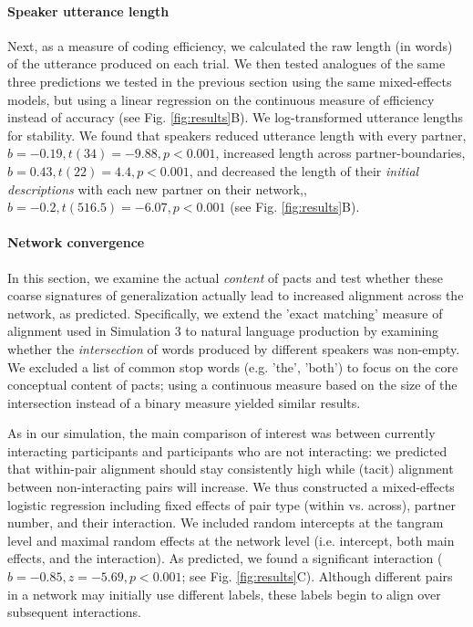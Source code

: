 \paragraph{Speaker utterance length}

Next, as a measure of coding efficiency, we calculated the raw length (in words) of the utterance produced on each trial.
We then tested analogues of the same three predictions we tested in the previous section using the same mixed-effects models, but using a linear regression on the continuous measure of efficiency instead of accuracy (see Fig. \ref{fig:results}B).
We log-transformed utterance lengths for stability.
We found that speakers reduced utterance length with every partner, $b = -0.19, t(34) = -9.88, p < 0.001$, increased length across partner-boundaries, $b = 0.43, t(22) = 4.4, p < 0.001$, and decreased the length of their \emph{initial descriptions} with each new partner on their network,, $b = -0.2, t(516.5) = -6.07, p < 0.001$ (see Fig. \ref{fig:results}B).

\paragraph{Network convergence }

In this section, we examine the actual \emph{content} of pacts and test whether these coarse signatures of generalization actually lead to increased alignment across the network, as predicted. 
Specifically, we extend the 'exact matching' measure of alignment used in Simulation 3 to natural language production by examining whether the \emph{intersection} of words produced by different speakers was non-empty.
We excluded a list of common stop words (e.g. 'the', 'both') to focus on the core conceptual content of pacts; using a continuous measure based on the size of the intersection instead of a binary measure yielded similar results.

As in our simulation, the main comparison of interest was between currently interacting participants and participants who are not interacting: we predicted that within-pair alignment should stay consistently high while (tacit) alignment between non-interacting pairs will increase. 
We thus constructed a mixed-effects logistic regression including fixed effects of pair type (within vs. across), partner number, and their interaction.
We included random intercepts at the tangram level and maximal random effects at the network level (i.e. intercept, both main effects, and the interaction).
As predicted, we found a significant interaction ($b = -0.85, z = -5.69, p < 0.001$; see Fig. \ref{fig:results}C).
Although different pairs in a network may initially use different labels, these labels begin to align over subsequent interactions. 

